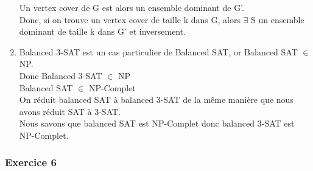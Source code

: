 \documentclass[]{article}
\begin{document}
\begin{enumerate}
      Un vertex cover de G est alors un ensemble dominant de G'.\\
      Donc, si on trouve un vertex cover de taille k dans G, alors $\exists$ S un ensemble dominant de taille k dans G' et inversement.\\
      \smallbreak

    \item
      Balanced 3-SAT est un cas particulier de Balanced SAT, or Balanced SAT $\in$ NP.\\
      Donc Balanced 3-SAT $\in$ NP\\

      Balanced SAT $\in$ NP-Complet\\

      On réduit balanced SAT à balanced 3-SAT de la même manière que nous avons réduit SAT à 3-SAT.\\
      Nous savons que balanced SAT est NP-Complet donc balanced 3-SAT est NP-Complet.\\

\end{enumerate}

\subsubsection{Exercice 6}
\end{document}
